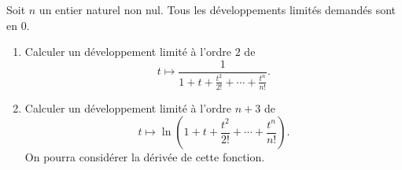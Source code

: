 Soit $n$ un entier naturel non nul. Tous les développements limités demandés sont en $0$.
\begin{enumerate}
 \item Calculer un développement limité à l'ordre $2$ de
\[
 t \mapsto \frac{1}{1 + t + \frac{t^2}{2!} + \cdots + \frac{t^n}{n!}}.
\]

 \item Calculer un développement limité à l'ordre $n+3$ de
\[
t \mapsto \ln \left ( 1+t+\frac{t^{2}}{2!}+ \cdots +\frac{t^{n}}{n!}\right ).
\]
On pourra considérer la dérivée de cette fonction.
\end{enumerate}
